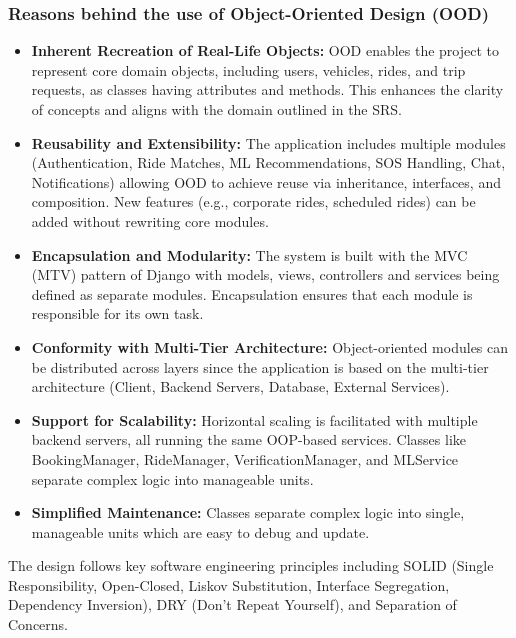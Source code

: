 \subsubsection{Reasons behind the use of Object-Oriented Design (OOD)}

\begin{itemize}
    \item \textbf{Inherent Recreation of Real-Life Objects:} OOD enables the project to represent core domain objects, including users, vehicles, rides, and trip requests, as classes having attributes and methods. This enhances the clarity of concepts and aligns with the domain outlined in the SRS.
    
    \item \textbf{Reusability and Extensibility:} The application includes multiple modules (Authentication, Ride Matches, ML Recommendations, SOS Handling, Chat, Notifications) allowing OOD to achieve reuse via inheritance, interfaces, and composition. New features (e.g., corporate rides, scheduled rides) can be added without rewriting core modules.
    
    \item \textbf{Encapsulation and Modularity:} The system is built with the MVC (MTV) pattern of Django with models, views, controllers and services being defined as separate modules. Encapsulation ensures that each module is responsible for its own task.
    
    \item \textbf{Conformity with Multi-Tier Architecture:} Object-oriented modules can be distributed across layers since the application is based on the multi-tier architecture (Client, Backend Servers, Database, External Services).
    
    \item \textbf{Support for Scalability:} Horizontal scaling is facilitated with multiple backend servers, all running the same OOP-based services. Classes like BookingManager, RideManager, VerificationManager, and MLService separate complex logic into manageable units.
    
    \item \textbf{Simplified Maintenance:} Classes separate complex logic into single, manageable units which are easy to debug and update.
\end{itemize}

The design follows key software engineering principles including SOLID (Single Responsibility, Open-Closed, Liskov Substitution, Interface Segregation, Dependency Inversion), DRY (Don't Repeat Yourself), and Separation of Concerns.

